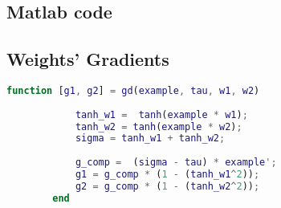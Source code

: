 
\begin{appendices}
    \section{Matlab code}
    \subsection{Weights' Gradients}
    \label{sub:gradients}
    \begin{lstlisting}[language=Matlab] 
        function [g1, g2] = gd(example, tau, w1, w2)
    
            tanh_w1 =  tanh(example * w1);
            tanh_w2 = tanh(example * w2);
            sigma = tanh_w1 + tanh_w2;
            
            g_comp =  (sigma - tau) * example';
            g1 = g_comp * (1 - (tanh_w1^2));
            g2 = g_comp * (1 - (tanh_w2^2));
        end
    \end{lstlisting}
\end{appendices}
